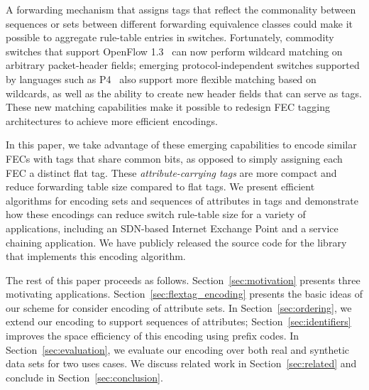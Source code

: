 A forwarding mechanism that assigns tags that reflect the commonality
between sequences or sets between different forwarding equivalence
classes could make it possible to aggregate rule-table entries in
switches.  Fortunately, commodity switches that support OpenFlow
1.3~\cite{of13} can now perform wildcard matching on arbitrary
packet-header fields; emerging protocol-independent switches supported
by languages such as P4~\cite{P4} also support more flexible matching
based on wildcards, as well as the ability to create new header fields
that can serve as tags. These new matching capabilities make it
possible to redesign FEC tagging architectures to achieve more
efficient encodings.

In this paper, we take advantage of these emerging capabilities to
encode similar FECs with tags that share common bits, as opposed to
simply assigning each FEC a distinct flat tag.  These
\emph{attribute-carrying tags} are more compact and reduce forwarding
table size compared to flat tags. We present efficient algorithms for
encoding sets and sequences of attributes in tags and demonstrate how
these encodings can reduce switch rule-table size for a variety of
applications, including an SDN-based Internet Exchange Point and a
service chaining application. We have publicly released the source
code for the library that implements this encoding algorithm.

The rest of this paper proceeds as
follows. Section~\ref{sec:motivation} presents three motivating
applications. Section~\ref{sec:flextag_encoding}
presents the basic ideas of our scheme for consider encoding of
attribute sets. In Section~\ref{sec:ordering}, we extend our encoding
to support sequences of attributes; Section~\ref{sec:identifiers}
improves the space efficiency of this encoding using prefix codes. In
Section~\ref{sec:evaluation}, we evaluate our encoding over both real
and synthetic data sets for two uses cases. We discuss related work in
Section~\ref{sec:related} and conclude in
Section~\ref{sec:conclusion}.


